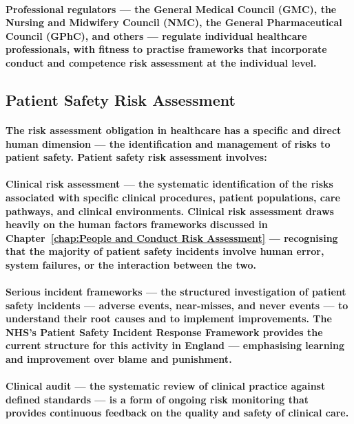 \paragraph{\textbf{Professional regulators} — the General Medical Council (GMC), the Nursing and Midwifery Council (NMC), the General Pharmaceutical Council (GPhC), and others — regulate individual healthcare professionals, with fitness to practise frameworks that incorporate conduct and competence risk assessment at the individual level.}

\subsection{Patient Safety Risk Assessment}
\paragraph{The risk assessment obligation in healthcare has a specific and direct human dimension — the identification and management of risks to patient safety. Patient safety risk assessment involves:}
\paragraph{\textbf{Clinical risk assessment} — the systematic identification of the risks associated with specific clinical procedures, patient populations, care pathways, and clinical environments. Clinical risk assessment draws heavily on the human factors frameworks discussed in Chapter~\ref{chap:People and Conduct Risk Assessment} — recognising that the majority of patient safety incidents involve human error, system failures, or the interaction between the two.}
\paragraph{\textbf{Serious incident frameworks} — the structured investigation of patient safety incidents — adverse events, near-misses, and never events — to understand their root causes and to implement improvements. The \textbf{NHS's Patient Safety Incident Response Framework} provides the current structure for this activity in England — emphasising learning and improvement over blame and punishment.}
\paragraph{\textbf{Clinical audit} — the systematic review of clinical practice against defined standards — is a form of ongoing risk monitoring that provides continuous feedback on the quality and safety of clinical care.}
